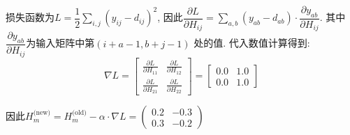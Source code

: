 损失函数为$L=\dfrac{1}{2}\displaystyle\sum_{i,j}(y_{ij}-d_{ij})^2$, 因此$\dfrac{\partial L}{\partial H_{ij}}=\displaystyle\sum_{a,b}
(y_{ab}-d_{ab})\cdot\dfrac{\partial y_{ab}}{\partial H_{ij}}$. 其中$\dfrac{\partial y_{ab}}{\partial H_{ij}}$为输入矩阵中第$(i+a-1,b+j-1)$
处的值. 代入数值计算得到:
\begin{equation*}
    \nabla L=\left[
        \begin{array}{cc}
            \frac{\partial L}{\partial H_{11}} & \frac{\partial L}{\partial H_{12}} \\
            \frac{\partial L}{\partial H_{21}} & \frac{\partial L}{\partial H_{22}}
        \end{array}
    \right]
    =
    \left[
        \begin{array}{cc}
            0.0 & 1.0 \\ 0.0 & 1.0
        \end{array}
    \right]
\end{equation*}

因此$H_m^\text{(new)}=H_m^\text{(old)}-\alpha\cdot\nabla L = \left(\begin{array}{cc}
    0.2 & -0.3 \\ 0.3 & -0.2
\end{array}\right)$

